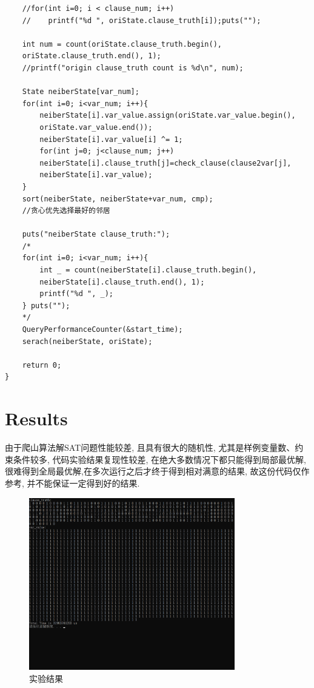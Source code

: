 \documentclass[UTF8]{ctexart}
\begin{document}
\begin{lstlisting}
    //for(int i=0; i < clause_num; i++) 
    //    printf("%d ", oriState.clause_truth[i]);puts("");
    
    int num = count(oriState.clause_truth.begin(), 
    oriState.clause_truth.end(), 1);
    //printf("origin clause_truth count is %d\n", num);
    
    State neiberState[var_num];
    for(int i=0; i<var_num; i++){
        neiberState[i].var_value.assign(oriState.var_value.begin(), 
        oriState.var_value.end());
        neiberState[i].var_value[i] ^= 1;
        for(int j=0; j<clause_num; j++)
        neiberState[i].clause_truth[j]=check_clause(clause2var[j], 
        neiberState[i].var_value);
    }
    sort(neiberState, neiberState+var_num, cmp);
    //贪心优先选择最好的邻居
    
    puts("neiberState clause_truth:");
    /*
    for(int i=0; i<var_num; i++){
        int _ = count(neiberState[i].clause_truth.begin(),
        neiberState[i].clause_truth.end(), 1);
        printf("%d ", _);
    } puts("");
    */
    QueryPerformanceCounter(&start_time);
    serach(neiberState, oriState);
    
    return 0;
} 
\end{lstlisting}

\section{Results}
由于爬山算法解SAT问题性能较差, 且具有很大的随机性, 尤其是样例变量数、约束条件较多, 代码实验结果复现性较差, 在绝大多数情况下都只能得到局部最优解, 很难得到全局最优解,在多次运行之后才终于得到相对满意的结果, 故这份代码仅作参考, 并不能保证一定得到好的结果.
\begin{figure}[H]
    \centering
    \includegraphics[width=0.8\textwidth]{res.bmp}
    \caption{实验结果}
\end{figure}


%
%
\end{document}
